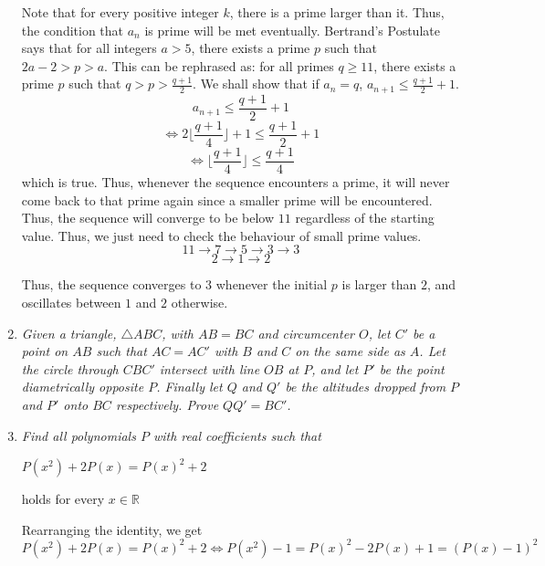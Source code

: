 \documentclass{article}
\begin{document}
\begin{enumerate}
Note that for every positive integer $k$, there is a prime larger than it. Thus, the condition that $a_n$ is prime will be met eventually. Bertrand's Postulate says that for all integers $a > 5$, there exists a prime $p$ such that $2a - 2 > p > a$. This can be rephrased as: for all primes $q \ge 11$, there exists a prime $p$ such that $q > p > \frac{q + 1}{2}$. We shall show that if $a_n = q$, $a_{n + 1} \le \frac{q + 1}{2} + 1$.
$$a_{n + 1} \le \frac{q + 1}{2} + 1$$
$$\iff 2\lfloor \frac{q + 1}{4}\rfloor + 1 \le \frac{q + 1}{2} + 1$$
$$\iff \lfloor \frac{q + 1}{4} \rfloor \le \frac{q + 1}{4}$$
which is true. Thus, whenever the sequence encounters a prime, it will never come back to that prime again since a smaller prime will be encountered. Thus, the sequence will converge to be below $11$ regardless of the starting value. Thus, we just need to check the behaviour of small prime values.
$$11 \rightarrow 7 \rightarrow 5 \rightarrow 3 \rightarrow 3$$
$$2 \rightarrow 1 \rightarrow 2$$

Thus, the sequence converges to $3$ whenever the initial $p$ is larger than $2$, and oscillates between $1$ and $2$ otherwise.

\medskip
\item %
{\itshape Given a triangle, $\triangle ABC$, with $AB = BC$ and circumcenter $O$, let $C'$ be a point on $AB$ such that $AC = AC'$ with $B$ and $C$ on the same side as $A$. Let the circle through $CBC'$ intersect with line $OB$ at $P$, and let $P'$ be the point diametrically opposite $P$. Finally let $Q$ and $Q'$ be the altitudes dropped from $P$ and $P'$ onto $BC$ respectively. Prove $QQ' = BC'$.
}


\medskip
\item %
{\itshape Find all polynomials $P$ with real coefficients such that
\begin{center}
    $P(x^2) + 2P(x) = {P(x)}^2 + 2$
\end{center}
holds for every $x\in\mathbb{R}$
}
Rearranging the identity, we get
$$P(x^2) + 2P(x) = {P(x)}^2 + 2 \iff P(x^2) - 1 = {P(x)}^2 - 2P(x) + 1 = (P(x) - 1)^2$$


\end{enumerate}
\end{document}
